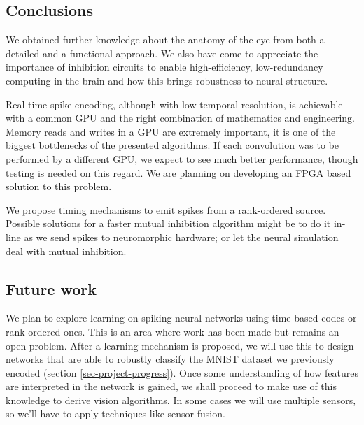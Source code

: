 \subsection{Conclusions}
We obtained further knowledge about the anatomy of the eye from both a detailed 
and a functional approach. We also have come to appreciate the importance of 
inhibition circuits to enable high-efficiency, low-redundancy computing in the 
brain and how this brings robustness to neural structure. 

Real-time spike encoding, although with low temporal resolution, is achievable 
with a common GPU and the right combination of mathematics and 
engineering. Memory reads and writes in a GPU are extremely important, it is 
one of the biggest bottlenecks of the presented algorithms. If each convolution 
was to be performed by a different GPU, we expect to see much better 
performance, though testing is needed on this regard. We are planning on 
developing an FPGA based solution to this problem.

We propose timing mechanisms to emit spikes from a rank-ordered
source. Possible solutions for a faster mutual inhibition algorithm 
might be to do it in-line as we send spikes to neuromorphic hardware; 
or let the neural simulation deal with mutual inhibition.

\subsection{Future work}
We plan to explore learning on spiking neural networks using time-based codes or
rank-ordered ones. This is an area where work has been made but remains an
open problem.
After a learning mechanism is proposed, we will use this to design networks that
are able to robustly classify the MNIST dataset we previously encoded (section 
\ref{sec-project-progress}). Once some understanding of how features are
interpreted in the network is gained, we shall proceed to make use of this 
knowledge to derive vision algorithms. In some cases we will 
use multiple sensors, so we'll have to apply techniques like sensor fusion.


